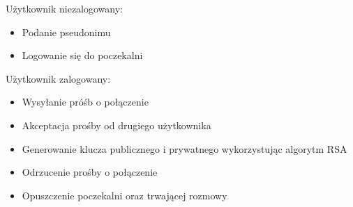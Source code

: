 Użytkownik niezalogowany: 
\begin{itemize}
\item Podanie pseudonimu
\item Logowanie się do poczekalni
\end{itemize}
Użytkownik zalogowany:
\begin{itemize}
	\item Wysyłanie próśb o połączenie
	\item Akceptacja prośby od drugiego użytkownika
	\item Generowanie klucza publicznego i prywatnego wykorzystując algorytm RSA
	\item Odrzucenie prośby o połączenie
	\item Opuszczenie poczekalni oraz trwającej rozmowy	
\end{itemize}
